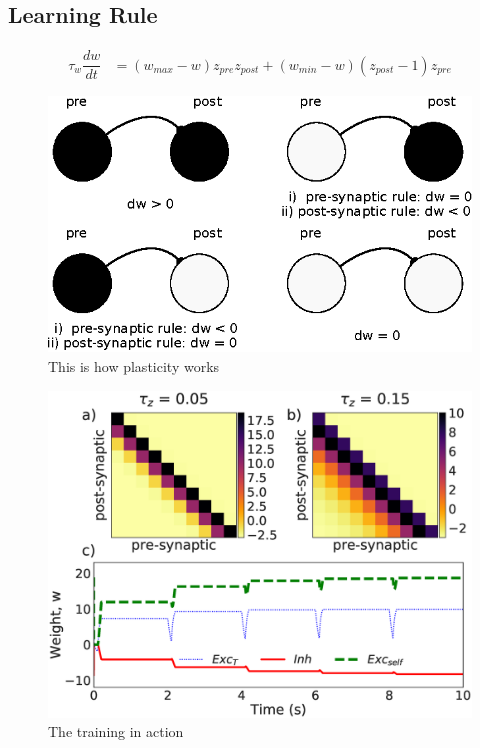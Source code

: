 \documentclass{esannV2}
\begin{document}
\subsection{Learning Rule}

\begin{align}
\tau_w \dfrac{dw}{dt} &= (w_{max} - w) z_{pre}z_{post} + (w_{min} - w) (z_{post} - 1)z_{pre} 
\end{align}

\begin{figure}[h!]
\centering
\includegraphics[scale=1.3]{plasticity_diagram.eps}
\caption{This is how plasticity works}\label{Fig:plasticity diagram}
\end{figure}


\begin{figure}[h!]
\centering
\includegraphics[scale=0.3]{training_rule.eps}
\caption{The training in action}\label{Fig:epochs}
\end{figure}
\end{document}
